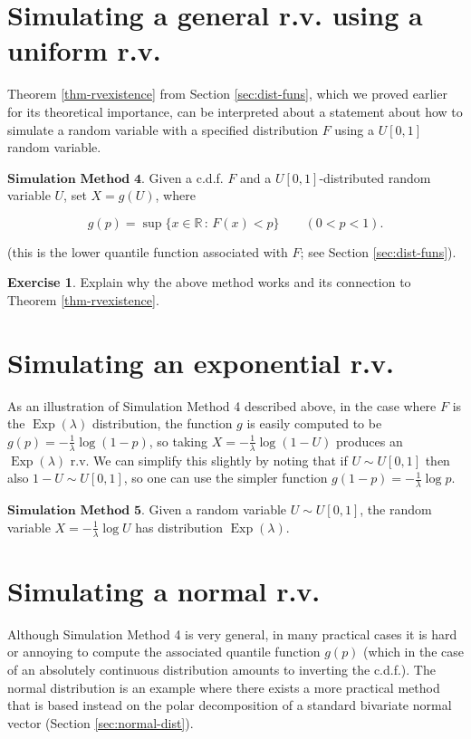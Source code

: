 \documentclass[11pt]{report}
\newcommand{\R}{\mathbb{R}}
\theoremstyle{plain}
\theoremstyle{definition}
\newtheorem{xexercise}[thm]{Exercise}
\begin{document}
\section{Simulating a general r.v. using a uniform r.v.}
Theorem \ref{thm-rvexistence} from Section
\ref{sec:dist-funs}, which we proved earlier for its
theoretical importance, can be interpreted about a
statement about how to simulate a random variable with
a specified distribution $F$ using a $U[0,1]$ random
variable.

$\textbf{Simulation Method 4.}$ Given a c.d.f. $F$
and a $U[0,1]$-distributed random variable $U$, set
$X=g(U)$, where

\[
g(p) = \sup \{ x\in\R\,:\, F(x) < p \} \qquad (0<p<1).
\]

(this is the lower quantile function associated with
$F$; see Section \ref{sec:dist-funs}).

\begin{xexercise}
Explain why the above method works and its connection
to Theorem \ref{thm-rvexistence}.
\end{xexercise}

\section{Simulating an exponential r.v.}
As an illustration of Simulation Method 4 described
above, in the case where $F$ is the
$\operatorname{Exp}(\lambda)$ distribution, the
function $g$ is easily computed to be
$g(p)=-\frac{1}{\lambda} \log(1-p)$, so taking
$X=-\frac{1}{\lambda} \log (1-U)$ produces an
$\operatorname{Exp}(\lambda)$ r.v. We can simplify
this slightly by noting that if $U\sim U[0,1]$ then
also $1-U \sim U[0,1]$, so one can use the simpler
function $g(1-p)=-\frac{1}{\lambda}\log p$.

$\textbf{Simulation Method 5.}$ Given a random
variable $U\sim U[0,1]$, the random variable
$X = -\frac{1}{\lambda}\log U$ has distribution
$\operatorname{Exp}(\lambda)$.

\section{Simulating a normal r.v.}
Although Simulation Method 4 is very general, in many
practical cases it is hard or annoying to compute the
associated quantile function $g(p)$ (which in the
case of an absolutely continuous distribution amounts
to inverting the c.d.f.). The normal distribution is
an example where there exists a more practical method
that is based instead on the polar decomposition of a
standard bivariate normal vector (Section
\ref{sec:normal-dist}).
\end{document}
